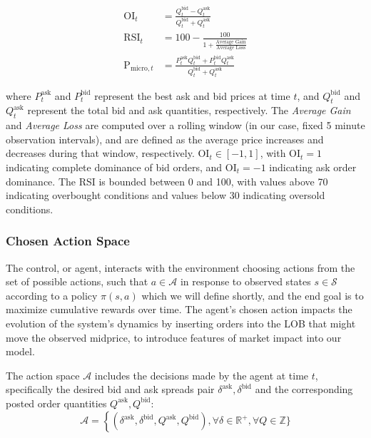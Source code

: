 \begin{equation}
    \begin{aligned}
        \text{OI}_t &= \frac{Q_t^{\text{bid}} - Q_t^{\text{ask}}}{Q_t^{\text{bid}} + Q_t^{\text{ask}}}\\
        \text{RSI}_t &= 100 - \frac{100}{1 + \frac{\text{Average Gain}}{\text{Average Loss}}}\\
        \text{P}_{\text{micro}, t} &= \frac{P_t^{\text{ask}} Q_t^{\text{bid}} + P_t^{\text{bid}} Q_t^{\text{ask}}}{Q_t^{\text{bid}} + Q_t^{\text{ask}}}
    \end{aligned}
    \label{eq:features}
\end{equation}

    where \( P_t^{\text{ask}} \) and \( P_t^{\text{bid}} \) represent the best ask and bid prices at time \( t \), and
    \( Q_t^{\text{bid}} \) and \( Q_t^{\text{ask}} \) represent the total bid and ask quantities, respectively.
    The \textit{Average Gain} and \textit{Average Loss} are computed over a rolling window (in our case, fixed 5 minute observation intervals),
    and are defined as the average price increases and decreases during that window, respectively.
    \( \text{OI}_t \in [-1, 1] \), with \( \text{OI}_t = 1 \) indicating complete dominance of bid orders, and \( \text{OI}_t = -1 \) indicating ask order dominance.
    The RSI is bounded between 0 and 100, with values above 70 indicating overbought conditions and values below 30 indicating oversold conditions.

\subsubsection{Chosen Action Space}

The control, or agent, interacts with the environment choosing actions from the set of possible actions,
such that $a \in \mathcal{A}$ in response to observed states $s \in \mathcal{S}$ according to a policy $\pi (s, a)$ which we will define shortly,
and the end goal is to maximize cumulative rewards over time.
The agent's chosen action impacts the evolution of the system's dynamics by inserting orders into the LOB that might move the observed midprice,
to introduce features of market impact into our model.

The action space $\mathcal{A}$ includes the decisions made by the agent at time $t$, specifically the desired bid and ask spreads pair
$\delta^{\text{ask}}, \delta^{\text{bid}}$ and the corresponding posted order quantities $Q^{\text{ask}}, Q^{\text{bid}}$:
$$
\mathcal{A} = \left\{ (\delta^{\text{ask}}, \delta^{\text{bid}}, Q^{\text{ask}}, Q^{\text{bid}}), \forall \delta \in \mathbb{R}^+, \forall Q \in \mathbb{Z}\} \right.
$$

